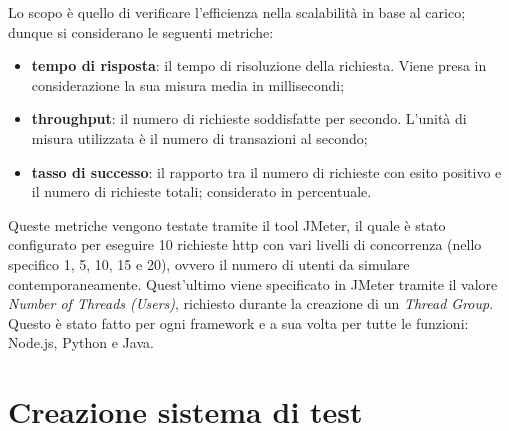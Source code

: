 \documentclass[12pt,a4paper,openany,twoside]{book}
\begin{document}
Lo scopo è quello di verificare l'efficienza nella scalabilità in base al carico; dunque si considerano le seguenti metriche:
\begin{itemize}
    \item \textbf{tempo di risposta}: il tempo di risoluzione della richiesta. Viene presa in considerazione la sua misura media in millisecondi;
    
    \item \textbf{throughput}: il numero di richieste soddisfatte per secondo. L'unità di misura utilizzata è il numero di transazioni al secondo;
    
    \item \textbf{tasso di successo}: il rapporto tra il numero di richieste con esito positivo e il numero di richieste totali; considerato in percentuale.
\end{itemize}
Queste metriche vengono testate tramite il tool JMeter, il quale è stato configurato per eseguire 10 richieste \ac{http} con vari livelli di concorrenza (nello specifico 1, 5, 10, 15 e 20), ovvero il numero di utenti da simulare contemporaneamente. Quest'ultimo viene specificato in JMeter tramite il valore \textit{Number of Threads (Users)}, richiesto durante la creazione di un \textit{Thread Group}. Questo è stato fatto per ogni framework e a sua volta per tutte le funzioni: Node.js, Python e Java.


\chapter{Creazione sistema di test}
\label{chap:creazione-sistema-test}
\end{document}
